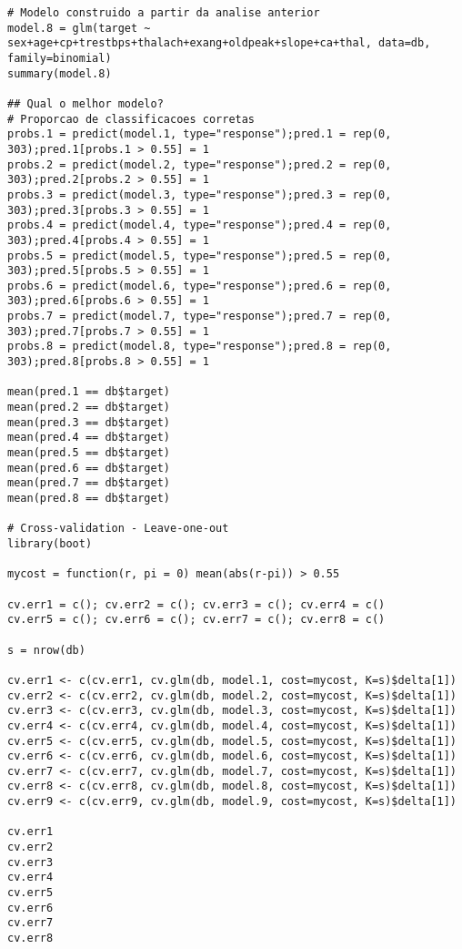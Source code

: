\documentclass[a4paper]{report}
\begin{document}
\begin{lstlisting}[breaklines,basicstyle=\small]
# Modelo construido a partir da analise anterior
model.8 = glm(target ~ sex+age+cp+trestbps+thalach+exang+oldpeak+slope+ca+thal, data=db, family=binomial)
summary(model.8)

## Qual o melhor modelo?
# Proporcao de classificacoes corretas
probs.1 = predict(model.1, type="response");pred.1 = rep(0, 303);pred.1[probs.1 > 0.55] = 1 
probs.2 = predict(model.2, type="response");pred.2 = rep(0, 303);pred.2[probs.2 > 0.55] = 1 
probs.3 = predict(model.3, type="response");pred.3 = rep(0, 303);pred.3[probs.3 > 0.55] = 1 
probs.4 = predict(model.4, type="response");pred.4 = rep(0, 303);pred.4[probs.4 > 0.55] = 1 
probs.5 = predict(model.5, type="response");pred.5 = rep(0, 303);pred.5[probs.5 > 0.55] = 1 
probs.6 = predict(model.6, type="response");pred.6 = rep(0, 303);pred.6[probs.6 > 0.55] = 1 
probs.7 = predict(model.7, type="response");pred.7 = rep(0, 303);pred.7[probs.7 > 0.55] = 1
probs.8 = predict(model.8, type="response");pred.8 = rep(0, 303);pred.8[probs.8 > 0.55] = 1

mean(pred.1 == db$target)
mean(pred.2 == db$target)
mean(pred.3 == db$target)
mean(pred.4 == db$target)
mean(pred.5 == db$target)
mean(pred.6 == db$target)
mean(pred.7 == db$target)
mean(pred.8 == db$target)

# Cross-validation - Leave-one-out
library(boot)

mycost = function(r, pi = 0) mean(abs(r-pi)) > 0.55

cv.err1 = c(); cv.err2 = c(); cv.err3 = c(); cv.err4 = c()
cv.err5 = c(); cv.err6 = c(); cv.err7 = c(); cv.err8 = c()

s = nrow(db)

cv.err1 <- c(cv.err1, cv.glm(db, model.1, cost=mycost, K=s)$delta[1])
cv.err2 <- c(cv.err2, cv.glm(db, model.2, cost=mycost, K=s)$delta[1])
cv.err3 <- c(cv.err3, cv.glm(db, model.3, cost=mycost, K=s)$delta[1])
cv.err4 <- c(cv.err4, cv.glm(db, model.4, cost=mycost, K=s)$delta[1])
cv.err5 <- c(cv.err5, cv.glm(db, model.5, cost=mycost, K=s)$delta[1])
cv.err6 <- c(cv.err6, cv.glm(db, model.6, cost=mycost, K=s)$delta[1])
cv.err7 <- c(cv.err7, cv.glm(db, model.7, cost=mycost, K=s)$delta[1])
cv.err8 <- c(cv.err8, cv.glm(db, model.8, cost=mycost, K=s)$delta[1])
cv.err9 <- c(cv.err9, cv.glm(db, model.9, cost=mycost, K=s)$delta[1])

cv.err1
cv.err2
cv.err3
cv.err4
cv.err5
cv.err6
cv.err7
cv.err8


\end{lstlisting}
\end{document}
